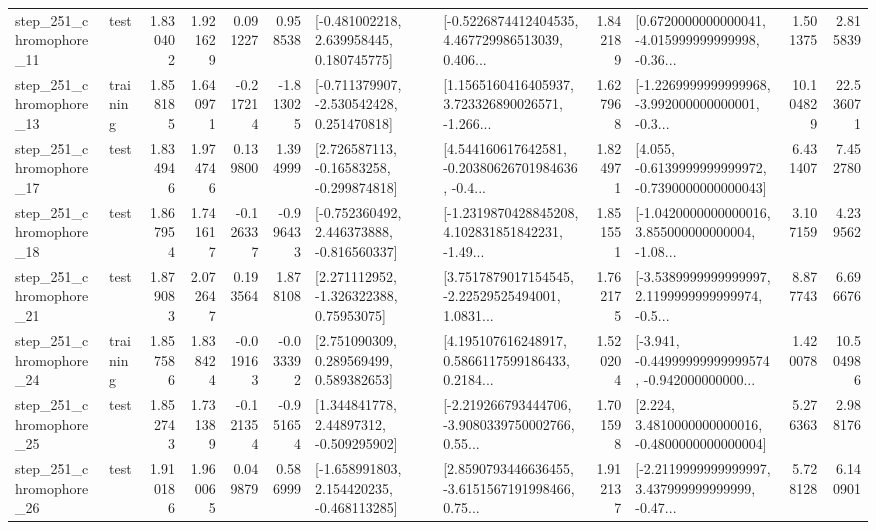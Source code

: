\begin{tabular}{llrrrrllrlrr}
  step\_251\_chromophore\_11 &      test &      1.830402 &    1.921629 &      0.091227 &  0.958538 &    [-0.481002218, 2.639958445, 0.180745775] &  [-0.5226874412404535, 4.467729986513039, 0.406... &       1.842189 &  [0.6720000000000041, -4.015999999999998, -0.36... &            1.501375 &          2.815839 \\
  step\_251\_chromophore\_13 &  training &      1.858185 &    1.640971 &     -0.217214 & -1.813025 &   [-0.711379907, -2.530542428, 0.251470818] &  [1.1565160416405937, 3.723326890026571, -1.266... &       1.627968 &  [-1.2269999999999968, -3.992000000000001, -0.3... &           10.104829 &         22.536071 \\
  step\_251\_chromophore\_17 &      test &      1.834946 &    1.974746 &      0.139800 &  1.394999 &    [2.726587113, -0.16583258, -0.299874818] &  [4.544160617642581, -0.20380626701984636, -0.4... &       1.824971 &  [4.055, -0.6139999999999972, -0.7390000000000043] &            6.431407 &          7.452780 \\
  step\_251\_chromophore\_18 &      test &      1.867954 &    1.741617 &     -0.126337 & -0.996433 &   [-0.752360492, 2.446373888, -0.816560337] &  [-1.2319870428845208, 4.102831851842231, -1.49... &       1.851551 &  [-1.0420000000000016, 3.855000000000004, -1.08... &            3.107159 &          4.239562 \\
  step\_251\_chromophore\_21 &      test &      1.879083 &    2.072647 &      0.193564 &  1.878108 &     [2.271112952, -1.326322388, 0.75953075] &  [3.7517879017154545, -2.22529525494001, 1.0831... &       1.762175 &  [-3.5389999999999997, 2.1199999999999974, -0.5... &            8.877743 &          6.696676 \\
  step\_251\_chromophore\_24 &  training &      1.857586 &    1.838424 &     -0.019163 & -0.033392 &     [2.751090309, 0.289569499, 0.589382653] &  [4.195107616248917, 0.5866117599186433, 0.2184... &       1.520204 &  [-3.941, -0.44999999999999574, -0.942000000000... &            1.420078 &         10.504986 \\
  step\_251\_chromophore\_25 &      test &      1.852743 &    1.731389 &     -0.121354 & -0.951654 &     [1.344841778, 2.44897312, -0.509295902] &  [-2.219266793444706, -3.9080339750002766, 0.55... &       1.701598 &   [2.224, 3.4810000000000016, -0.4800000000000004] &            5.276363 &          2.988176 \\
  step\_251\_chromophore\_26 &      test &      1.910186 &    1.960065 &      0.049879 &  0.586999 &   [-1.658991803, 2.154420235, -0.468113285] &  [2.8590793446636455, -3.6151567191998466, 0.75... &       1.912137 &  [-2.2119999999999997, 3.437999999999999, -0.47... &            5.728128 &          6.140901 \\

\end{tabular}
